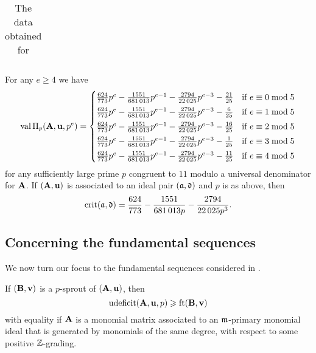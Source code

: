 \documentclass{amsart}
\begin{document}
\begin{example}
\begin{table}
\begin{center}
\begin{tabular}{cccc}
         \end{tabular}
         \endgroup
      \end{center}
      \caption{The data obtained for }
      \label{table: new example data}
   \end{table}
   For any $e\ge 4$ we have
   \[
      \operatorname{val}\Pi_p(\mathbf{A},\mathbf{u},p^e) =
      \begin{cases}
         \frac{624}{773}p^{e} - \frac{\num{1551}}{\num{681013}}p^{e-1} - \frac{\num{2794}}{\num{22025}}p^{e-3} - \frac{21}{25} & \text{if $e \equiv 0 \bmod 5$}\\[1mm]
         \frac{624}{773}p^{e} - \frac{\num{1551}}{\num{681013}}p^{e-1} - \frac{\num{2794}}{\num{22025}}p^{e-3} - \frac{6}{25} & \text{if $e \equiv 1 \bmod 5$}\\[1mm]
         \frac{624}{773}p^{e} - \frac{\num{1551}}{\num{681013}}p^{e-1} - \frac{\num{2794}}{\num{22025}}p^{e-3} - \frac{16}{25} & \text{if $e \equiv 2 \bmod 5$}\\[1mm]
         \frac{624}{773}p^{e} - \frac{\num{1551}}{\num{681013}}p^{e-1} - \frac{\num{2794}}{\num{22025}}p^{e-3} - \frac{1}{25} & \text{if $e \equiv 3 \bmod 5$}\\[1mm]
         \frac{624}{773}p^{e} - \frac{\num{1551}}{\num{681013}}p^{e-1} - \frac{\num{2794}}{\num{22025}}p^{e-3} - \frac{11}{25} & \text{if $e \equiv 4 \bmod 5$}
      \end{cases}
   \]
   for any sufficiently large prime $p$ congruent to $11$ modulo a universal denominator for $\mathbf{A}$.
   If $(\mathbf{A},\mathbf{u})$ is associated to an ideal pair $(\mathfrak{a},\mathfrak{d})$ and $p$ is as above, then
   \[\operatorname{crit}(\mathfrak{a},\mathfrak{d}) = \frac{624}{773} - \frac{\num{1551}}{\num{681013} p} - \frac{\num{2794}}{\num{22025} p^3}.\]
\end{example}

\subsection{Concerning the fundamental sequences}

We now turn our focus to the fundamental sequences considered in .

\begin{lemma}
   \label{non-leading coefficients: L}
   If $(\mathbf{B}, \mathbf{v})$ is a $p$-sprout of $(\mathbf{A}, \mathbf{u})$, then
   \[
      \operatorname{udeficit}(\mathbf{A}, \mathbf{u}, p) \geqslant \operatorname{ft}(\mathbf{B}, \mathbf{v})
   \]
   with equality if $\mathbf{A}$ is a monomial matrix associated to an $\mathfrak{m}$-primary monomial ideal that is generated by monomials of the same degree, with respect to some positive $\mathbb{Z}$-grading.
\end{lemma}
\end{document}
